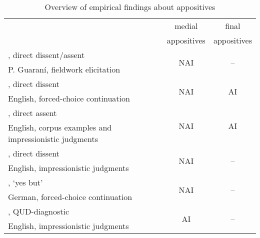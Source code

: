 \documentclass[times,linguex,xcolor]{glossa}
\begin{document}
  \begin{table}[ht]
    \caption{Overview of empirical findings about appositives}
    \label{tab:appositive-previous-findings}
    \centering
  
    \begin{tabular}{l c c}\toprule
                                    & medial         & final        \\
                                    & appositives    & appositives    \\\midrule\midrule

      \citealt{tonhauser_diagnosing_2012}, direct dissent/assent     & \multirow{2}{*}{NAI}
                                                    & \multirow{2}{*}{--} \\ 
      \scriptsize P. Guaraní, fieldwork elicitation  &  \\ \midrule

      \citealt{syrett_experimental_2015}, direct dissent     & \multirow{2}{*}{NAI}
                                                    & \multirow{2}{*}{AI} \\ 
      \scriptsize English, forced-choice continuation  &  \\ \midrule

      \citealt{anderbois_at-issue_2015}, direct assent     & \multirow{2}{*}{NAI}
                                                    & \multirow{2}{*}{AI} \\ 
      \scriptsize English, corpus examples and impressionistic judgments   &  \\ \midrule

      \citealt{koev_notions_2018}, direct dissent     & \multirow{2}{*}{NAI}
                                                    & \multirow{2}{*}{--} \\ 
      \scriptsize English, impressionistic judgments  &  \\ \midrule

      \citealt{destruel_cross-linguistic_2015}, `yes but'     & \multirow{2}{*}{NAI}
                                                    & \multirow{2}{*}{--} \\ 
      \scriptsize German, forced-choice continuation  &  \\ \midrule\midrule

      \citealt{koev_notions_2018}, QUD-diagnostic 
                                    & \multirow{2}{*}{AI}
                                                    & \multirow{2}{*}{--} \\ 
      \scriptsize English, impressionistic judgments  &  \\ \midrule


\end{tabular}
\end{table}
\end{document}
